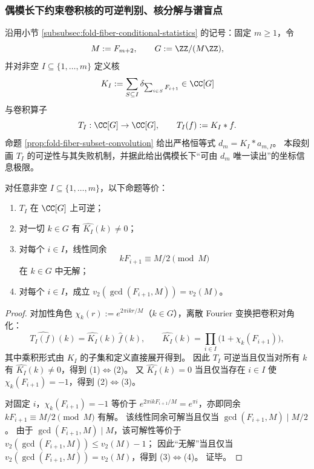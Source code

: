 %
\subsubsection{偶模长下约束卷积核的可逆判别、核分解与谱盲点}\label{subsubsec:fold-fiber-convolution-kernel-invertibility-even-modulus}
沿用小节 \ref{subsubsec:fold-fiber-conditional-statistics} 的记号：固定 \(m\ge 1\)，令
\[
M:=F_{m+2},\qquad G:=\ZZ/(M\ZZ),
\]
并对非空 \(I\subseteq\{1,\dots,m\}\) 定义核
\[
K_I:=\sum_{S\subseteq I}\delta_{\sum_{i\in S}F_{i+1}}\in \CC[G]
\]
与卷积算子
\[
T_I:\CC[G]\to \CC[G],\qquad T_I(f):=K_I*f.
\]
命题 \ref{prop:fold-fiber-subset-convolution} 给出严格恒等式 \(d_m=K_I*a_{m,I}\)。
本段刻画 \(T_I\) 的可逆性与其失败机制，并据此给出偶模长下“可由 \(d_m\) 唯一读出”的坐标信息极限。

\begin{theorem}[卷积核的完全可逆判别]\label{thm:fold-fiber-convolution-kernel-invertibility}
对任意非空 \(I\subseteq\{1,\dots,m\}\)，以下命题等价：
\begin{enumerate}
\normalfont
  \item \(T_I\) 在 \(\CC[G]\) 上可逆；
  \item 对一切 \(k\in G\) 有 \(\widehat{K_I}(k)\neq 0\)；
  \item 对每个 \(i\in I\)，线性同余
  \[
  kF_{i+1}\equiv M/2\pmod M
  \]
  在 \(k\in G\) 中无解；
  \item 对每个 \(i\in I\)，成立 \(v_2(\gcd(F_{i+1},M))=v_2(M)\)。
\end{enumerate}
\end{theorem}
\begin{proof}
对加性角色 \(\chi_k(r):=e^{2\pi i kr/M}\)（\(k\in G\)），离散 Fourier 变换把卷积对角化：
\[
\widehat{T_I(f)}(k)=\widehat{K_I}(k)\,\widehat f(k),
\qquad
\widehat{K_I}(k)=\prod_{i\in I}\bigl(1+\chi_k(F_{i+1})\bigr),
\]
其中乘积形式由 \(K_I\) 的子集和定义直接展开得到。
因此 \(T_I\) 可逆当且仅当对所有 \(k\) 有 \(\widehat{K_I}(k)\neq 0\)，得到 (1)\(\Leftrightarrow\)(2)。
又 \(\widehat{K_I}(k)=0\) 当且仅当存在 \(i\in I\) 使 \(\chi_k(F_{i+1})=-1\)，得到 (2)\(\Leftrightarrow\)(3)。

对固定 \(i\)，\(\chi_k(F_{i+1})=-1\) 等价于 \(e^{2\pi i kF_{i+1}/M}=e^{\pi i}\)，亦即同余
\(
kF_{i+1}\equiv M/2\pmod M
\) 有解。
该线性同余可解当且仅当 \(\gcd(F_{i+1},M)\mid M/2\)。
由于 \(\gcd(F_{i+1},M)\mid M\)，该可解性等价于
\(
v_2(\gcd(F_{i+1},M))\le v_2(M)-1
\)；
因此“无解”当且仅当 \(v_2(\gcd(F_{i+1},M))=v_2(M)\)，得到 (3)\(\Leftrightarrow\)(4)。
证毕。
\end{proof}

